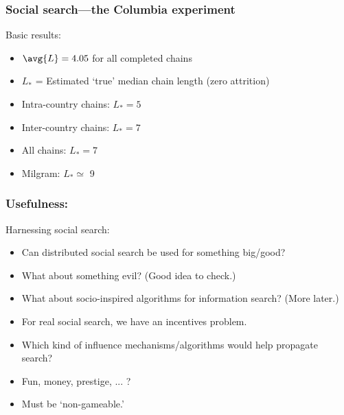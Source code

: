 %
%

\begin{frame}
  \frametitle{Social search---the Columbia experiment}
  \begin{block}{Basic results:}
    
    \begin{itemize}
    \item<1->
      $\avg{L} = 4.05$ for all completed chains
    \item<2->
      $L_\ast$ = Estimated `true' median chain length (zero attrition)
    \item<3->
      Intra-country chains: $L_\ast = 5$ 
    \item<4->
      Inter-country chains:
      $L_\ast = 7$ 
    \item<5->
      All chains:
      $L_\ast = 7$ 
    \item<6->
      Milgram:
      $L_\ast \simeq$ 9
    \end{itemize}
  \end{block}

\end{frame}

\begin{frame}
  \frametitle{Usefulness:}

  \begin{block}{Harnessing social search:}
    \begin{itemize}
    \item<2->
      Can distributed social search be used for something big/good? 
    \item<3->
      What about something evil?  (Good idea to check.)
    \item<4->
      What about socio-inspired algorithms for information search?  (More later.)
    \item<5->
      For real social search, we have an incentives problem.
    \item<6->
      Which kind of influence mechanisms/algorithms 
      would help propagate search?
    \item<7->
      Fun, money, prestige, ... ?
    \item<8->
      Must be `non-gameable.'
    \end{itemize}
  \end{block}

\end{frame}

